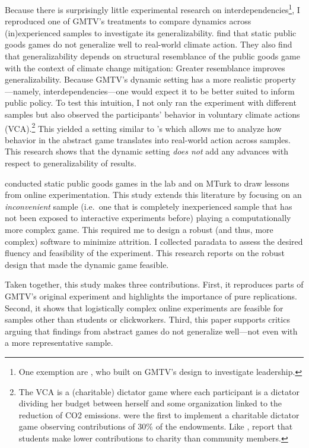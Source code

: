 \documentclass[
  authoryear,
  preprint,
  3p]{elsarticle}
\begin{document}
Because there is surprisingly little experimental research on
interdependencies\footnote{One exemption are \citet{Moser2019}, who
  built on GMTV's design to investigate leadership.}, I reproduced one
of GMTV's treatments to compare dynamics across (in)experienced samples
to investigate its generalizability. \citet{GKLS2020} find that static
public goods games do not generalize well to real-world climate action.
They also find that generalizability depends on structural resemblance
of the public goods game with the context of climate change mitigation:
Greater resemblance improves generalizability. Because GMTV's dynamic
setting has a more realistic property---namely, interdependencies---one
would expect it to be better suited to inform public policy. To test
this intuition, I not only ran the experiment with different samples but
also observed the participants' behavior in voluntary climate actions
(VCA).\footnote{The VCA is a (charitable) dictator game where each
  participant is a dictator dividing her budget between herself and some
  organization linked to the reduction of CO2 emissions.
  \citet{EckelGrossman1996} were the first to implement a charitable
  dictator game observing contributions of 30\% of the endowments. Like
  \citet{GKLS2020}, \citet{CarpenterEtAl2008} report that students make
  lower contributions to charity than community members.} This yielded a
setting similar to \citet{GKLS2020}'s which allows me to analyze how
behavior in the abstract game translates into real-world action across
samples. This research shows that the dynamic setting \emph{does not}
add any advances with respect to generalizability of results.

\citet{AGM2018} conducted static public goods games in the lab and on
MTurk to draw lessons from online experimentation. This study extends
this literature
\citetext{\citealp[see][]{GoodmanPaolacci2017}; \citealp[also][]{AmirEtAl2012}}
by focusing on an \emph{inconvenient} sample (i.e.~one that is
completely inexperienced sample that has not been exposed to interactive
experiments before) playing a computationally more complex game. This
required me to design a robust (and thus, more complex) software to
minimize attrition. I collected paradata to assess the desired fluency
and feasibility of the experiment. This research reports on the robust
design that made the dynamic game feasible.

Taken together, this study makes three contributions. First, it
reproduces parts of GMTV's original experiment and highlights the
importance of pure replications. Second, it shows that logistically
complex online experiments are feasible for samples other than students
or clickworkers. Third, this paper supports critics arguing that
findings from abstract games do not generalize well---not even with a
more representative sample.
\end{document}
